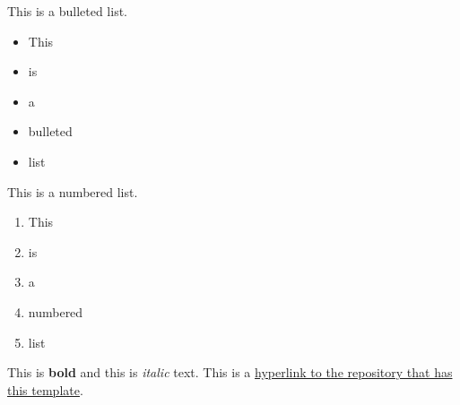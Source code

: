 \documentclass[english]{article}
\begin{document}
This is a bulleted list.

\begin{itemize}
	\item This
	\item is
	\item a
	\item bulleted
	\item list
\end{itemize}

This is a numbered list.

\begin{enumerate}
	\item This
	\item is
	\item a
	\item numbered
	\item list
\end{enumerate}

This is \textbf{bold} and this is \textit{italic} text.
This is a \href{https://www.gitlab.com/jakevandervaate/latex-templates}{hyperlink to the repository that has this template}.
\end{document}
